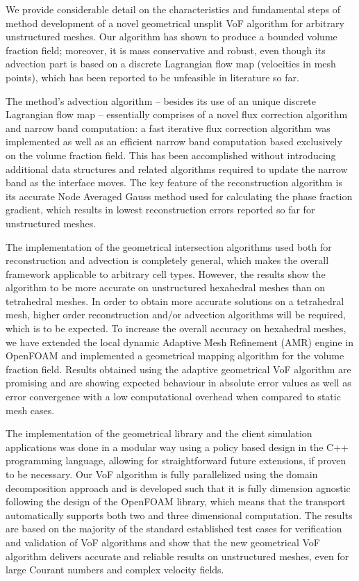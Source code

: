 %
%
We provide considerable detail on the characteristics and fundamental steps of method 
development of a novel geometrical unsplit VoF algorithm for arbitrary unstructured 
meshes. Our algorithm has shown to produce a bounded volume fraction field; moreover, 
it is mass conservative and robust, even though its advection part is based on 
a discrete Lagrangian flow map (velocities in mesh points), which has been 
reported to be unfeasible in literature so far. 

%
%
The method's advection algorithm -- besides its use of an unique discrete 
Lagrangian flow map -- essentially comprises of a novel flux correction 
algorithm and narrow band computation: a fast iterative flux correction 
algorithm was implemented as well as an efficient narrow band computation 
based exclusively on the volume fraction field. This has been accomplished 
without introducing additional data structures and related algorithms 
required to update the narrow band as the interface moves. %
The key feature of the reconstruction algorithm is its accurate Node Averaged Gauss 
method used for calculating the phase fraction gradient, which results in lowest 
reconstruction errors reported so far for unstructured meshes.


The implementation of the geometrical intersection algorithms used both for 
reconstruction and advection is completely general, which makes the overall 
framework applicable to arbitrary cell types. %
However, the results show the algorithm to be more accurate on
unstructured hexahedral meshes than on tetrahedral meshes. In order to obtain
more accurate solutions on a tetrahedral mesh, higher order reconstruction
and/or advection algorithms will be required, which is to be expected. 
To increase the overall accuracy on hexahedral meshes, we have
extended the local dynamic Adaptive Mesh Refinement (AMR) engine in OpenFOAM
and implemented a geometrical mapping algorithm for the volume fraction field.
Results obtained using the adaptive geometrical VoF algorithm are promising and
are showing expected behaviour in absolute error values as well as error
convergence with a low computational overhead when compared to static mesh 
cases.  

The implementation of the geometrical library and the client simulation 
applications was done in a modular way using a policy based design in the C++ 
programming language, allowing for straightforward future extensions, if proven 
to be necessary. %
Our VoF algorithm is fully parallelized using the domain decomposition approach 
and is developed such that it is fully dimension agnostic following the design 
of the OpenFOAM library, which means that the transport automatically supports 
both two and three dimensional computation. The results are based on the majority 
of the standard established test cases for verification and validation of VoF 
algorithms and show that the new geometrical VoF algorithm delivers accurate and 
reliable results on unstructured meshes, even for large Courant numbers and 
complex velocity fields.

